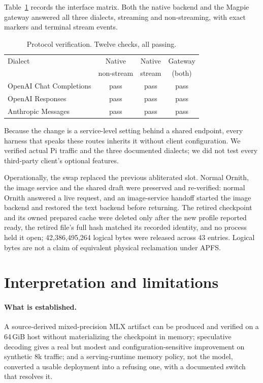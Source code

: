 \documentclass[11pt]{article}
\begin{document}
Table~\ref{tab:protocol} records the interface matrix. Both the native backend and the Magpie gateway answered all three dialects, streaming and non-streaming, with exact markers and terminal stream events.

\begin{table}[H]
\centering
\small
\caption{Protocol verification. Twelve checks, all passing.}
\label{tab:protocol}
\begin{tabularx}{\linewidth}{@{}Xccc@{}}
\toprule
Dialect & Native & Native & Gateway\\
 & non-stream & stream & (both)\\
\midrule
OpenAI Chat Completions & pass & pass & pass\\
OpenAI Responses & pass & pass & pass\\
Anthropic Messages & pass & pass & pass\\
\bottomrule
\end{tabularx}
\end{table}

Because the change is a service-level setting behind a shared endpoint, every harness that speaks these routes inherits it without client configuration. We verified actual Pi traffic and the three documented dialects; we did not test every third-party client's optional features.

Operationally, the swap replaced the previous abliterated slot. Normal Ornith, the image service and the shared draft were preserved and re-verified: normal Ornith answered a live request, and an image-service handoff started the image backend and restored the text backend before returning. The retired checkpoint and its owned prepared cache were deleted only after the new profile reported ready, the retired file's full hash matched its recorded identity, and no process held it open; 42{,}386{,}495{,}264 logical bytes were released across 43 entries. Logical bytes are not a claim of equivalent physical reclamation under APFS.

\section{Interpretation and limitations}
\paragraph{What is established.} A source-derived mixed-precision MLX artifact can be produced and verified on a 64\,GiB host without materializing the checkpoint in memory; speculative decoding gives a real but modest and configuration-sensitive improvement on synthetic 8k traffic; and a serving-runtime memory policy, not the model, converted a usable deployment into a refusing one, with a documented switch that resolves it.
\end{document}
